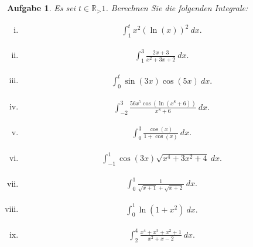 \documentclass[a4paper, 20]{exam}
\newtheorem{ex}{Aufgabe}
\begin{document}
\begin{ex} Es sei $t \in \mathbb{R}_>1$. Berechnen Sie die folgenden Integrale:
\begin{enumerate}[i)]
\item \begin{align*}
\int_1^t x^2 ( \ln(x))^2 ~dx.
\end{align*}
\item \begin{align*}
\int_1^3 \frac{2x+3}{x^2+3x+2}~dx.
\end{align*}
\item \begin{align*}
\int_0^t \sin(3x) \cos(5x)~dx .
\end{align*}
\item \begin{align*}
\int_{-2}^3 \frac{56x^7 \cos( \ln (x^8 + 6))}{x^8+6}~dx.
\end{align*}
\item \begin{align*}
\int_0^3 \frac{\cos (x)}{1+\cos(x)}~dx.
\end{align*}
\item \begin{align*}
\int_{-1}^1 \cos(3x) \sqrt{x^4+3x^2 +4} ~dx.
\end{align*}
\item \begin{align*}
\int_0^1 \frac{1}{\sqrt{x+1}+\sqrt{x+2}}~dx.
\end{align*}
\item \begin{align*}
\int_0^1 \ln (1 +x^2 )~dx .
\end{align*}
\item \begin{align*}
\int_2^4 \frac{x^4 +x^3 +x^2+1}{x^2+x-2} ~dx.
\end{align*}
\end{enumerate}
\end{ex}
\end{document}
